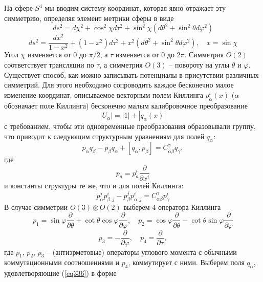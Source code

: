 \documentclass[12pt]{article}
\theoremstyle{definition}
\begin{document}
На сфере $S^4$ мы вводим систему координат, которая явно отражает эту симметрию, определяя элемент метрики сферы в виде
\begin{equation}
    ds^2=d\chi^2+\cos^2\chi d\tau^2+\sin^2\chi(d\theta^2+\sin^2\theta d\varphi^2)
\end{equation}
\begin{equation}
    ds^2=\frac{dx^2}{1-x^2}+(1-x^2)d\tau^2+x^2(d\theta^2+\sin^2\theta d\varphi^2),\quad x=\sin\chi
\end{equation}
Угол $\chi$ изменяется от $0$ до $\pi/2$, а $\tau$ изменяется от $0$ до $2\pi$. Симметрия $O(2)$ соответствует трансляции по $\tau$, а симметрия $O(3)$ -- повороту на углы $\theta$ и $\varphi$.\\
Существует способ, как можно записывать потенциалы в присутствии различных симметрий. Для этого необходимо сопроводить каждое бесконечно малое изменение координат, описываемое векторным полем Киллинга $p^i_\alpha(x)$ ($\alpha$ обозначает поле Киллинга) бесконечно малым калибровочное преобразование
\begin{equation}
    |U_\alpha|=|1|+|q_\alpha(x)|
\end{equation}
с требованием, чтобы эти одновременные преобразования образовывали группу, что приводит к следующим структурным уравнениям для полей $q_\alpha$:
\begin{equation}\label{eq336}
    p_\alpha q_\beta-p_\beta q_\alpha+[q_\alpha,p_\beta]=C_{\alpha\beta}^\gamma q_\gamma,
\end{equation}
где
\begin{equation}
    p_a=p^i_a\frac{\partial}{\partial x^i}
\end{equation}
и константы структуры те же, что и для полей Киллинга:
\begin{equation}
    p_\alpha^jp_{\beta,j}^i-p_\beta^jp_{\alpha,j}^i=C_{\alpha\beta}^\gamma p_\gamma^i
\end{equation}
В случае симметрии $O(3)\otimes O(2)$ выберем 4 оператора Киллинга
\begin{equation}
    p_1=\sin\varphi\frac{\partial}{\partial\theta}+\cot\theta\cos\varphi\frac{\partial}{\partial\varphi},\quad p_2=\cos\varphi\frac{\partial}{\partial\theta}-\cot\theta\sin\varphi\frac{\partial}{\partial\varphi}
\end{equation}
\begin{equation}
    p_3=-\frac{\partial}{\partial\varphi},\quad p_4=\frac{\partial}{\partial\tau},
\end{equation}
где $p_1$, $p_2$, $p_3$ -- (антиэрметовые) операторы углового момента с обычными коммутационными соотношениями и $p_4$, коммутирует с ними. Выберем поля $q_\alpha$, удовлетворяющие (\ref{eq336}) в форме
\end{document}
